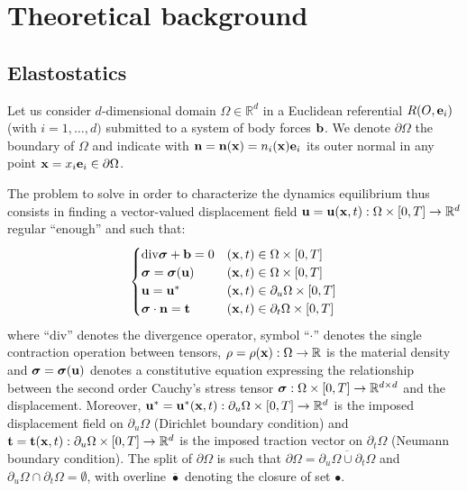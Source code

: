\chapter{Theoretical background}

\section{Elastostatics}

Let us consider $d$-dimensional domain $\Omega\in\mathbb{R}^{d}$ in a Euclidean referential $R(O,{\bf{e}}_{i})$ (with $i=1,\dots,d)$ submitted to a system of body forces ${\bf{b}}$. We denote $\partial\Omega$ the boundary of $\Omega$ and indicate with ${\bf{n}}={\bf{n}}({\bf{x}})=n_{i}({\bf{x}}){\bf{e}}_{i}$
its outer normal in any point ${\bf{x}}=x_{i}{\bf{e}}_{i}\in\partial\Omega$.

The problem to solve in order to characterize the dynamics equilibrium thus consists in finding a vector-valued displacement field ${\bf{u}}={\bf{u}}({\bf{x}},t):\Omega\times[0,T]\to\mathbb{R}^{d}$
regular ``enough'' and such that: 
\begin{equation}
\begin{cases}
\mathrm{\mathrm{div}}\mbox{\boldmath${\sigma}$}+{\bf{b}}=0 & ({\bf{x}},t)\in\Omega\times[0,T]\\
\mbox{\boldmath${\sigma}$}=\mbox{\boldmath${\sigma}$}({\bf{u}}) & ({\bf{x}},t)\in\Omega\times[0,T]\\
{\bf{u}}={\bf{u}}^{*} & ({\bf{x}},t)\in\partial_{u}\Omega\times[0,T]\\
\mbox{\boldmath${\sigma}$}\cdot{\bf{n}}={\bf t} & ({\bf{x}},t)\in\partial_{t}\Omega\times[0,T]
\end{cases}
\end{equation}
where ``$\mathrm{\mathrm{div}}$'' denotes the divergence operator, symbol ``$\cdot$'' denotes the single contraction operation between tensors, $\rho=\rho({\bf{x}}):\Omega\to\mathbb{R}$ is the material density and $\mbox{\boldmath${\sigma}$}=\mbox{\boldmath${\sigma}$}({\bf{u}})$ denotes a constitutive equation
expressing the relationship between the second order Cauchy's stress tensor $\mbox{\boldmath${\sigma}$}:\Omega\times[0,T]\to\mathbb{R}^{d\times d}$ and the displacement. Moreover, ${\bf{u}}^{*}={\bf{u}}^{*}({\bf{x}},t):\partial_{u}\Omega\times[0,T]\to\mathbb{R}^{d}$ is the imposed displacement field on $\partial_{u}\Omega$ (Dirichlet
boundary condition) and 
${\bf t}={\bf t}({\bf{x}},t):\partial_{u}\Omega\times[0,T]\to\mathbb{R}^{d}$
is the imposed traction vector on $\partial_{t}\Omega$ (Neumann boundary condition). The split of $\partial\Omega$ is such that $\partial\Omega=\overline{\partial_{u}\Omega\cup\partial_{t}\Omega}$ and $\partial_{u}\Omega\cap\partial_{t}\Omega=\emptyset$, with overline $\overline{\bullet}$ denoting the closure of set $\bullet$.


